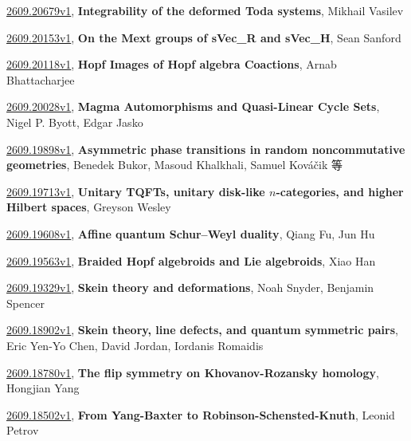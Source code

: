 \documentclass[9pt, a4paper]{article}
\theoremstyle{plain}
\theoremstyle{definition}
\theoremstyle{remark}
\newcommand{\arxiv}[3]{\href{https://arxiv.org/abs/#1}{#1}, \textbf{\textcolor{arxivblue}{#2}}, #3}
\begin{document}
\arxiv{2609.20679v1}{Integrability of the deformed Toda systems}{Mikhail Vasilev}

\arxiv{2609.20153v1}{On the Mext groups of sVec_R and sVec_H}{Sean Sanford}

\arxiv{2609.20118v1}{Hopf Images of Hopf algebra Coactions}{Arnab Bhattacharjee}

\arxiv{2609.20028v1}{Magma Automorphisms and Quasi-Linear Cycle Sets}{Nigel P. Byott, Edgar Jasko}

\arxiv{2609.19898v1}{Asymmetric phase transitions in random noncommutative geometries}{Benedek Bukor, Masoud Khalkhali, Samuel Kováčik 等}

\arxiv{2609.19713v1}{Unitary TQFTs, unitary disk-like $n$-categories, and higher Hilbert spaces}{Greyson Wesley}

\arxiv{2609.19608v1}{Affine quantum Schur--Weyl duality}{Qiang Fu, Jun Hu}

\arxiv{2609.19563v1}{Braided Hopf algebroids and Lie algebroids}{Xiao Han}

\arxiv{2609.19329v1}{Skein theory and deformations}{Noah Snyder, Benjamin Spencer}

\arxiv{2609.18902v1}{Skein theory, line defects, and quantum symmetric pairs}{Eric Yen-Yo Chen, David Jordan, Iordanis Romaidis}

\arxiv{2609.18780v1}{The flip symmetry on Khovanov-Rozansky homology}{Hongjian Yang}

\arxiv{2609.18502v1}{From Yang-Baxter to Robinson-Schensted-Knuth}{Leonid Petrov}

\end{document}

